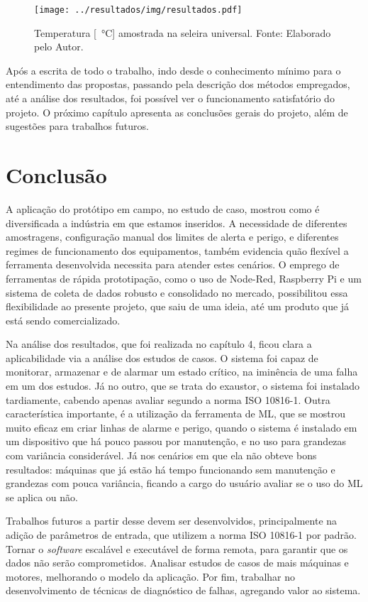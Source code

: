 \documentclass[a4paper]{ifacconf}
\begin{document}
\begin{figure}[h!]
  \begin{center}
      \texttt{[image: ../resultados/img/resultados.pdf]}
  \end{center}
  \caption{Temperatura [\SI{}{\celsius}] amostrada na seleira universal. Fonte: Elaborado pelo Autor.}
  \label{fig:seleira_universal_temperatura}
\end{figure}

Após a escrita de todo o trabalho, indo desde o conhecimento mínimo para o entendimento das propostas, passando pela descrição dos métodos
empregados, até a análise dos resultados, foi possível ver o funcionamento satisfatório do projeto. O próximo capítulo apresenta as conclusões
gerais do projeto, além de sugestões para trabalhos futuros.


\section{Conclusão}

A aplicação do protótipo em campo, no estudo de caso, mostrou como é diversificada a indústria em que estamos inseridos. 
A necessidade de diferentes amostragens, configuração manual dos limites de alerta e perigo, e diferentes regimes de funcionamento dos
equipamentos, também evidencia quão flexível a ferramenta desenvolvida necessita para atender estes cenários. O emprego de ferramentas de 
rápida prototipação, como o uso de Node-Red, Raspberry Pi e um sistema de coleta de dados robusto e consolidado no mercado, possibilitou essa 
flexibilidade ao presente projeto, que saiu de uma ideia, até um produto que já está sendo comercializado.

Na análise dos resultados, que foi realizada no capítulo 4, ficou clara a aplicabilidade via a análise dos estudos de casos. O sistema foi
capaz de monitorar, armazenar e de alarmar um estado crítico, na iminência de uma falha em um dos estudos. Já no outro, que se trata do exaustor,
o sistema foi instalado tardiamente, cabendo apenas avaliar segundo a norma ISO 10816-1. Outra característica importante, é a utilização da
ferramenta de ML, que se mostrou muito eficaz em criar linhas de alarme e perigo, quando o sistema é instalado em um dispositivo
que há pouco passou por manutenção, e no uso para grandezas com variância considerável. Já nos cenários em que ela não obteve bons resultados:
máquinas que já estão há tempo funcionando sem manutenção e grandezas com pouca variância, ficando a cargo do usuário avaliar se o uso do 
ML se aplica ou não. 

Trabalhos futuros a partir desse devem ser desenvolvidos, principalmente na adição de parâmetros de entrada, que utilizem a norma ISO 10816-1
por padrão. Tornar o \textit{software} escalável e executável de forma remota, para garantir que os dados não serão comprometidos. Analisar estudos de 
casos de mais máquinas e motores, melhorando o modelo da aplicação. Por fim, trabalhar no desenvolvimento de técnicas de diagnóstico de falhas,
agregando valor ao sistema.

\end{document}
